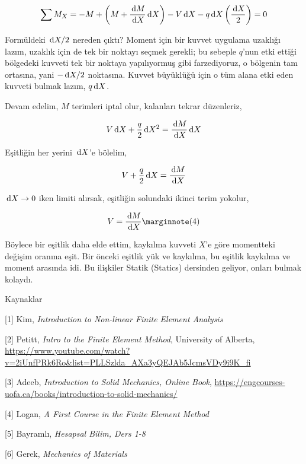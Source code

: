\documentclass[12pt,fleqn]{article}\usepackage{../../common}
\begin{document}
$$
\sum M_{X} = -M + \left( M + \frac{\,\mathrm{d} M}{\,\mathrm{d} X} \,\mathrm{d} X \right) -
V \,\mathrm{d} X - q \,\mathrm{d} X \left( \frac{\,\mathrm{d} X}{2}  \right) = 0
$$

Formüldeki $\,\mathrm{d} X / 2$ nereden çıktı? Moment için bir kuvvet uygulama uzaklığı
lazım, uzaklık için de tek bir noktayı seçmek gerekli; bu sebeple $q$'nun etki
ettiği bölgedeki kuvveti tek bir noktaya yapılıyormuş gibi farzediyoruz, o
bölgenin tam ortasına, yani $- \,\mathrm{d} X / 2$ noktasına.  Kuvvet büyüklüğü için o
tüm alana etki eden kuvveti bulmak lazım, $q \,\mathrm{d} X$.

Devam edelim, $M$ terimleri iptal olur, kalanları tekrar düzenleriz,

$$
V \,\mathrm{d} X + \frac{q}{2} \,\mathrm{d} X^2 = \frac{\,\mathrm{d} M}{\,\mathrm{d} X} \,\mathrm{d} X
$$

Eşitliğin her yerini $\,\mathrm{d} X$'e bölelim,

$$
V + \frac{q}{2} \,\mathrm{d} X = \frac{\,\mathrm{d} M}{\,\mathrm{d} X} 
$$

$\,\mathrm{d} X \to 0$ iken limiti alırsak, eşitliğin solundaki ikinci terim yokolur,

$$
V = \frac{\ud M}{\ud X}
\mlabel{4}
$$

Böylece bir eşitlik daha elde ettim, kaykılma kuvveti $X$'e göre momentteki
değişim oranına eşit. Bir önceki eşitlik yük ve kaykılma, bu eşitlik kaykılma ve
moment arasında idi. Bu ilişkiler Statik (Statics) dersinden geliyor, onları
bulmak kolaydı.

Kaynaklar

[1] Kim, {\em Introduction to Non-linear Finite Element Analysis}

[2] Petitt, {\em Intro to the Finite Element Method}, University of Alberta,
    \url{https://www.youtube.com/watch?v=2iUnfPRk6Ro&list=PLLSzlda_AXa3yQEJAb5JcmsVDy9i9K_fi}
    
[3] Adeeb, {\em Introduction to Solid Mechanics, Online Book},
    \url{https://engcourses-uofa.ca/books/introduction-to-solid-mechanics/}

[4] Logan, {\em A First Course in the Finite Element Method}

[5] Bayramlı, {\em Hesapsal Bilim, Ders 1-8}

[6] Gerek, {\em Mechanics of Materials}
\end{document}
